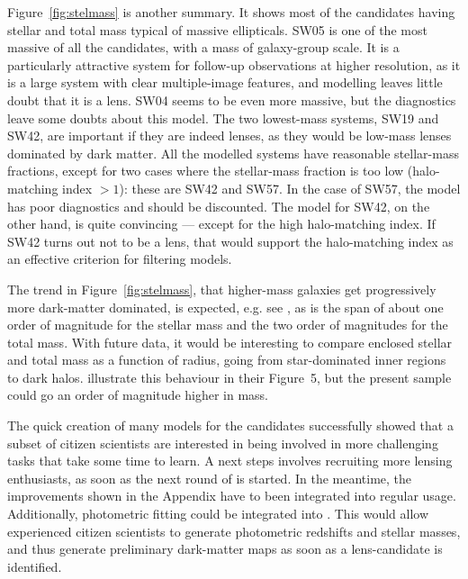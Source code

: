 Figure~\ref{fig:stelmass} is another summary.  It shows most of the
candidates having stellar and total mass typical of massive
ellipticals.  SW05 is one of the most massive of all the candidates, with a
mass of galaxy-group scale.  It is a particularly attractive system
for follow-up observations at higher resolution, as it is a large system
with clear multiple-image features, and modelling leaves little doubt
that it is a lens.
SW04 seems to be even more massive, but the diagnostics leave some doubts
about this model.
The two lowest-mass systems, SW19 and SW42, are
important if they are indeed lenses, as they would be low-mass lenses dominated 
by dark matter.  All the modelled systems have reasonable stellar-mass 
fractions, except for two cases where the stellar-mass fraction is too low 
(halo-matching index $>1$): these are SW42 and SW57.  In the case of SW57, the 
model has poor diagnostics and should be discounted.  The model for SW42, on the 
other hand, is quite convincing --- except for the high halo-matching index.  
If SW42 turns out not to be a lens, that would support the halo-matching index 
as an effective criterion for filtering models.

The trend in Figure~\ref{fig:stelmass}, that higher-mass galaxies get
progressively more dark-matter dominated, is expected,
e.g. see \cite{2005ApJ...623L...5F}, as is the span of about one order
of magnitude for the stellar mass and the two order of magnitudes for the total
mass.
With future data, it would be interesting to compare enclosed
stellar and total mass as a function of radius, going from
star-dominated inner regions to dark halos.
\cite{2011ApJ...740...97L} illustrate this behaviour in their
Figure~5, but the present sample could go an order of magnitude higher
in mass.

The quick creation of many models for the {\SW} candidates successfully showed
that a subset of citizen scientists are interested in being involved in more
challenging tasks that take some time to learn. A next steps involves
recruiting more lensing enthusiasts, as soon as the next round of {\SW} is
started.
In the meantime, the improvements shown in the Appendix have to been integrated
into regular {\SpL} usage.
Additionally, photometric fitting could be integrated into {\SpL}.
This would allow experienced citizen scientists to generate photometric
redshifts and stellar masses, and thus generate preliminary dark-matter maps
as soon as a lens-candidate is identified.


